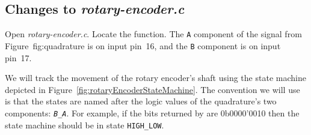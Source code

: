 \subsection{Changes to \textit{rotary-encoder.c}}

Open \textit{rotary-encoder.c}.
Locate the  function.
The \texttt{A} component of the signal from Figure~{fig:quadrature} is on input pin~16, and the \texttt{B} component is on input pin~17.
\begin{description}
\end{description}

We will track the movement of the rotary encoder's shaft using the state machine depicted in Figure~\ref{fig:rotaryEncoderStateMachine}.
The convention we will use is that the states are named after the logic values of the quadrature's two components: \texttt{\textit{B\_A}}.
For example, if the bits returned by  are 0b0000'0010 then the state machine should be in state \texttt{HIGH\_LOW}.

